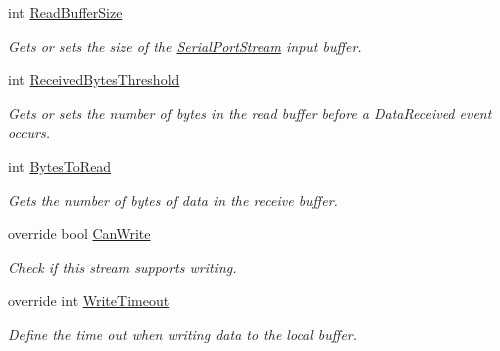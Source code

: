 \begin{DoxyCompactItemize}
int \mbox{\hyperlink{class_r_j_c_p_1_1_i_o_1_1_ports_1_1_serial_port_stream_a2f01d313972dcce89bc22372c44d85b1}{Read\+Buffer\+Size}}
\begin{DoxyCompactList}\small\item\em Gets or sets the size of the \mbox{\hyperlink{class_r_j_c_p_1_1_i_o_1_1_ports_1_1_serial_port_stream}{Serial\+Port\+Stream}} input buffer. \end{DoxyCompactList}\item 
int \mbox{\hyperlink{class_r_j_c_p_1_1_i_o_1_1_ports_1_1_serial_port_stream_adf0a1fc97efc92a4af67ed2560696188}{Received\+Bytes\+Threshold}}
\begin{DoxyCompactList}\small\item\em Gets or sets the number of bytes in the read buffer before a Data\+Received event occurs. \end{DoxyCompactList}\item 
int \mbox{\hyperlink{class_r_j_c_p_1_1_i_o_1_1_ports_1_1_serial_port_stream_ab76cab2ea478310b7dc0f1124d5c435c}{Bytes\+To\+Read}}
\begin{DoxyCompactList}\small\item\em Gets the number of bytes of data in the receive buffer. \end{DoxyCompactList}\item 
override bool \mbox{\hyperlink{class_r_j_c_p_1_1_i_o_1_1_ports_1_1_serial_port_stream_a58ce5a6609d89918d7e383d5a841565a}{Can\+Write}}
\begin{DoxyCompactList}\small\item\em Check if this stream supports writing. \end{DoxyCompactList}\item 
override int \mbox{\hyperlink{class_r_j_c_p_1_1_i_o_1_1_ports_1_1_serial_port_stream_ac81624fba3a2bfe67ddd418786803b43}{Write\+Timeout}}
\begin{DoxyCompactList}\small\item\em Define the time out when writing data to the local buffer. \end{DoxyCompactList}\item 

\end{DoxyCompactItemize}
